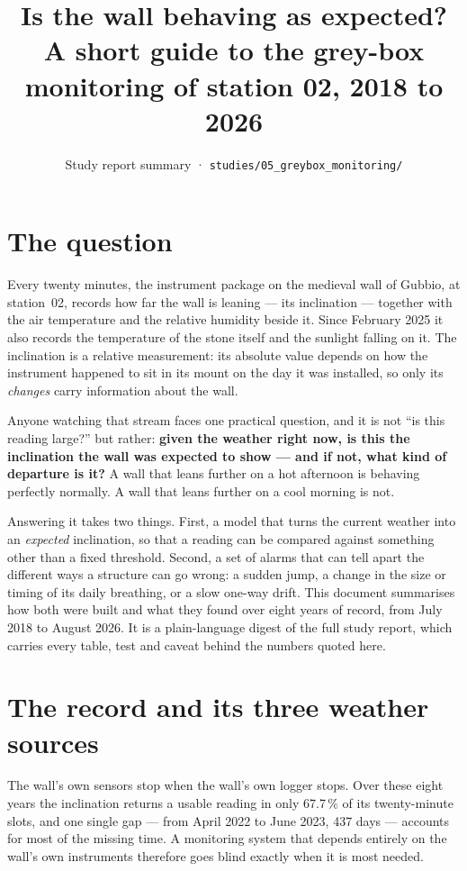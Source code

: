 \documentclass[11pt,a4paper]{article}
\title{\vspace{-1.2cm}\textbf{Is the wall behaving as expected?}\\[2mm]
\large A short guide to the grey-box monitoring of station 02, 2018 to 2026}
\author{Study report summary · \texttt{studies/05\_greybox\_monitoring/}}
\date{}
\begin{document}
\maketitle
\thispagestyle{fancy}

\section{The question}

Every twenty minutes, the instrument package on the medieval wall of Gubbio, at
station~02, records how far the wall is leaning --- its inclination --- together
with the air temperature and the relative humidity beside it. Since February 2025
it also records the temperature of the stone itself and the sunlight falling on
it. The inclination is a relative measurement: its absolute value depends on how
the instrument happened to sit in its mount on the day it was installed, so only
its \emph{changes} carry information about the wall.

Anyone watching that stream faces one practical question, and it is not ``is this
reading large?'' but rather: \textbf{given the weather right now, is this the
inclination the wall was expected to show --- and if not, what kind of departure
is it?} A wall that leans further on a hot afternoon is behaving perfectly
normally. A wall that leans further on a cool morning is not.

Answering it takes two things. First, a model that turns the current weather into
an \emph{expected} inclination, so that a reading can be compared against
something other than a fixed threshold. Second, a set of alarms that can tell
apart the different ways a structure can go wrong: a sudden jump, a change in the
size or timing of its daily breathing, or a slow one-way drift. This document
summarises how both were built and what they found over eight years of record,
from July 2018 to August 2026. It is a plain-language digest of the full study
report, which carries every table, test and caveat behind the numbers quoted
here.

\section{The record and its three weather sources}

The wall's own sensors stop when the wall's own logger stops. Over these eight
years the inclination returns a usable reading in only 67.7\,\% of its
twenty-minute slots, and one single gap --- from April 2022 to June 2023, 437
days --- accounts for most of the missing time. A monitoring system that depends
entirely on the wall's own instruments therefore goes blind exactly when it is
most needed.
\end{document}
